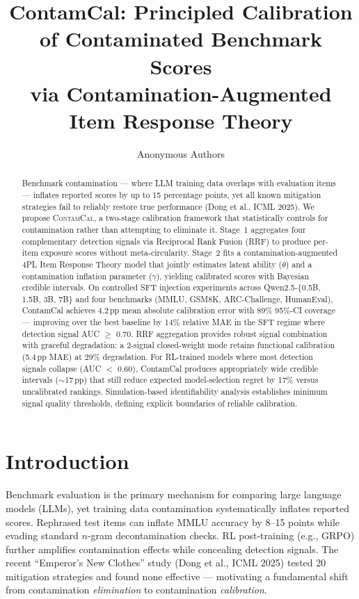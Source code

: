 \documentclass[letterpaper,11pt]{article}
\title{ContamCal: Principled Calibration of Contaminated Benchmark Scores\\via Contamination-Augmented Item Response Theory}
\author{Anonymous Authors}
\begin{document}
\maketitle

\begin{abstract}
Benchmark contamination --- where LLM training data overlaps with evaluation items --- inflates reported scores by up to 15 percentage points, yet all known mitigation strategies fail to reliably restore true performance (Dong et al., ICML 2025). We propose \textsc{ContamCal}, a two-stage calibration framework that statistically controls for contamination rather than attempting to eliminate it. Stage~1 aggregates four complementary detection signals via Reciprocal Rank Fusion (RRF) to produce per-item exposure scores without meta-circularity. Stage~2 fits a contamination-augmented 4PL Item Response Theory model that jointly estimates latent ability ($\theta$) and a contamination inflation parameter ($\gamma$), yielding calibrated scores with Bayesian credible intervals. On controlled SFT injection experiments across Qwen2.5-\{0.5B, 1.5B, 3B, 7B\} and four benchmarks (MMLU, GSM8K, ARC-Challenge, HumanEval), ContamCal achieves 4.2\,pp mean absolute calibration error with 89\% 95\%-CI coverage --- improving over the best baseline by 14\% relative MAE in the SFT regime where detection signal AUC $\geq$ 0.70. RRF aggregation provides robust signal combination with graceful degradation: a 2-signal closed-weight mode retains functional calibration (5.4\,pp MAE) at 29\% degradation. For RL-trained models where most detection signals collapse (AUC $<$ 0.60), ContamCal produces appropriately wide credible intervals ($\sim$17\,pp) that still reduce expected model-selection regret by 17\% versus uncalibrated rankings. Simulation-based identifiability analysis establishes minimum signal quality thresholds, defining explicit boundaries of reliable calibration.
\end{abstract}

\section{Introduction}

Benchmark evaluation is the primary mechanism for comparing large language models (LLMs), yet training data contamination systematically inflates reported scores. Rephrased test items can inflate MMLU accuracy by 8--15 points while evading standard $n$-gram decontamination checks. RL post-training (e.g., GRPO) further amplifies contamination effects while concealing detection signals. The recent ``Emperor's New Clothes'' study (Dong et al., ICML 2025) tested 20 mitigation strategies and found none effective --- motivating a fundamental shift from contamination \emph{elimination} to contamination \emph{calibration}.
\end{document}
